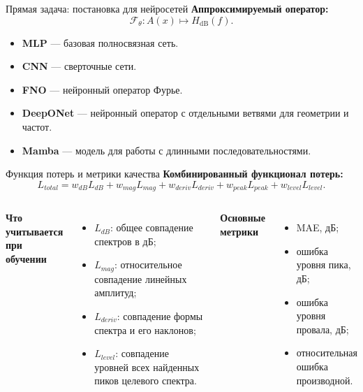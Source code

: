 \documentclass[aspectratio=169,10pt]{beamer}
\newcommand{\Hdb}{H_{\mathrm{dB}}}
\begin{document}
\begin{frame}{Прямая задача: постановка для нейросетей}
\textbf{Аппроксимируемый оператор:}
\[
\mathcal{F}_{\theta}: A(x) \longmapsto \Hdb(f).
\]

\vspace{0.6em}
\begin{itemize}
    \item \textbf{MLP} --- базовая полносвязная сеть.
    \item \textbf{CNN} --- сверточные сети.
    \item \textbf{FNO} --- нейронный оператор Фурье.
    \item \textbf{DeepONet} --- нейронный оператор с отдельными ветвями для геометрии и частот.
    \item \textbf{Mamba} --- модель для работы с длинными последовательностями.
\end{itemize}
\end{frame}

\begin{frame}{Функция потерь и метрики качества}
\textbf{Комбинированный функционал потерь:}
\[
L_{total}=w_{dB}L_{dB}+w_{mag}L_{mag}+w_{deriv}L_{deriv}+w_{peak}L_{peak}+w_{level}L_{level}.
\]

\vspace{0.4em}
\begin{columns}[T]
\textbf{Что учитывается при обучении}
\begin{itemize}
    \item $L_{dB}$: общее совпадение спектров в дБ;
    \item $L_{mag}$: относительное совпадение линейных амплитуд;
    \item $L_{deriv}$: совпадение формы спектра и его наклонов;
    \item $L_{level}$: совпадение уровней всех найденных пиков целевого спектра.
\end{itemize}

\textbf{Основные метрики}
\begin{itemize}
    \item MAE, дБ;
    \item ошибка уровня пика, дБ;
    \item ошибка уровня провала, дБ;
    \item относительная ошибка производной.
\end{itemize}
\end{columns}
\end{frame}
\end{document}
